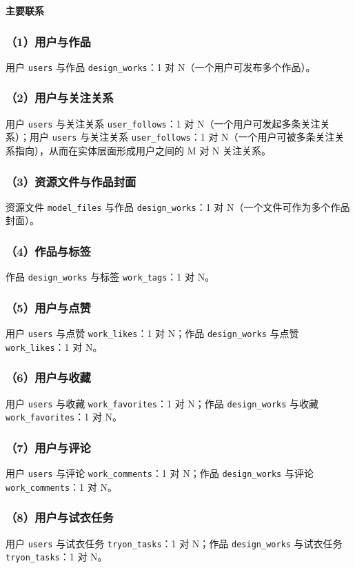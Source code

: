 \documentclass[twoside]{thesis-cls-Miya} %
\begin{document}
\textbf{主要联系}
\subsubsection*{（1）用户与作品}
用户 \texttt{users} 与作品 \texttt{design\_works}：1 对 N（一个用户可发布多个作品）。

\subsubsection*{（2）用户与关注关系}
用户 \texttt{users} 与关注关系 \texttt{user\_follows}：1 对 N（一个用户可发起多条关注关系）；用户 \texttt{users} 与关注关系 \texttt{user\_follows}：1 对 N（一个用户可被多条关注关系指向），从而在实体层面形成用户之间的 M 对 N 关注关系。

\subsubsection*{（3）资源文件与作品封面}
资源文件 \texttt{model\_files} 与作品 \texttt{design\_works}：1 对 N（一个文件可作为多个作品封面）。

\subsubsection*{（4）作品与标签}
作品 \texttt{design\_works} 与标签 \texttt{work\_tags}：1 对 N。

\subsubsection*{（5）用户与点赞}
用户 \texttt{users} 与点赞 \texttt{work\_likes}：1 对 N；作品 \texttt{design\_works} 与点赞 \texttt{work\_likes}：1 对 N。

\subsubsection*{（6）用户与收藏}
用户 \texttt{users} 与收藏 \texttt{work\_favorites}：1 对 N；作品 \texttt{design\_works} 与收藏 \texttt{work\_favorites}：1 对 N。

\subsubsection*{（7）用户与评论}
用户 \texttt{users} 与评论 \texttt{work\_comments}：1 对 N；作品 \texttt{design\_works} 与评论 \texttt{work\_comments}：1 对 N。

\subsubsection*{（8）用户与试衣任务}
用户 \texttt{users} 与试衣任务 \texttt{tryon\_tasks}：1 对 N；作品 \texttt{design\_works} 与试衣任务 \texttt{tryon\_tasks}：1 对 N。
\end{document}
